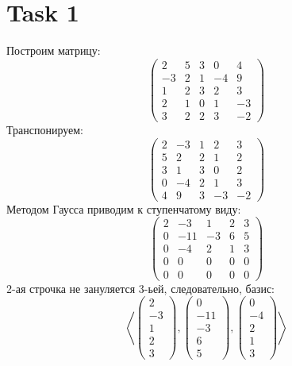 \section{Task 1}
Построим матрицу:
\begin{equation}
    \begin{pmatrix}
         2 & 5 & 3 &  0 &  4 \\
        -3 & 2 & 1 & -4 &  9 \\
         1 & 2 & 3 &  2 &  3 \\
         2 & 1 & 0 &  1 & -3 \\
         3 & 2 & 2 &  3 & -2 
    \end{pmatrix}
\end{equation}
Транспонируем:
\begin{equation}
    \begin{pmatrix}
        2 & -3 & 1 &  2 &  3 \\
        5 &  2 & 2 &  1 &  2 \\
        3 &  1 & 3 &  0 &  2 \\
        0 & -4 & 2 &  1 &  3 \\
        4 &  9 & 3 & -3 & -2
    \end{pmatrix}
\end{equation}
Методом Гаусса приводим к ступенчатому виду:
\begin{equation}
    \begin{pmatrix}
        2 &  -3 &  1 & 2 & 3 \\
        0 & -11 & -3 & 6 & 5 \\
        0 &  -4 &  2 & 1 & 3 \\
        0 &   0 &  0 & 0 & 0 \\
        0 &   0 &  0 & 0 & 0
    \end{pmatrix}
\end{equation}
2-ая строчка не зануляется 3-ьей, следовательно, базис:
\begin{equation}
    \left< 
        \begin{pmatrix}
            2\\-3\\1\\2\\3
        \end{pmatrix},
        \begin{pmatrix}
            0\\-11\\-3\\6\\5
        \end{pmatrix},
        \begin{pmatrix}
            0\\-4\\2\\1\\3
        \end{pmatrix}
     \right>
\end{equation}

